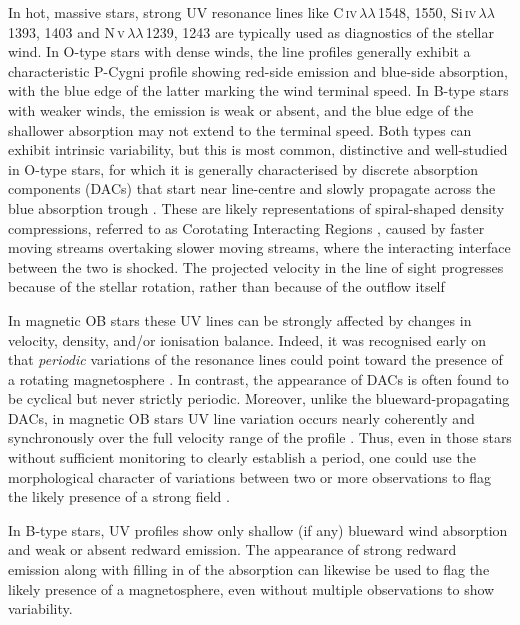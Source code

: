 \documentclass[useAMS,usenatbib]{mn2e}
\begin{document}
In hot, massive stars, strong UV resonance lines like C\,\textsc{iv}\,$\lambda\lambda$\,1548, 1550, Si\,\textsc{iv}\,$\lambda\lambda$\,1393, 1403 and N\,\textsc{v}\,$\lambda\lambda$\,1239, 1243 are typically used as diagnostics of the stellar wind. In O-type stars with dense winds, the line profiles generally exhibit a characteristic P-Cygni profile showing red-side emission and blue-side absorption, with the blue edge of the latter marking the wind terminal speed.
In B-type stars with weaker winds, the emission is weak or absent, and the blue edge of the shallower absorption may not extend to the terminal speed.
Both types can exhibit intrinsic variability, but this is most common, distinctive and well-studied in O-type stars, 
for which it is generally
characterised by discrete absorption components (DACs) that start near line-centre and 
slowly propagate across the blue absorption trough \citep[e.g.][]{1989ApJS...69..527H,1996A&AS..116..257K}. 
These are likely representations of spiral-shaped density compressions, referred to as Corotating Interacting Regions
\citep[CIRs,][]{1986A&A...165..157M}, caused by faster moving streams overtaking slower moving streams, where the interacting interface between the two is shocked. The projected velocity in the line of sight progresses because of the stellar rotation, rather than because of the outflow itself \citep{1996ApJ...462..469C}

In magnetic OB stars these UV lines can be strongly affected by changes in velocity, density, and/or ionisation balance.
Indeed, it was recognised early on that \textit{periodic} variations of the resonance lines could point toward the presence of a rotating magnetosphere \cite[e.g.][]{1990ApJ...365..665S,1993npsp.conf..186H,1994ApJ...425L..29W}.
In contrast, the appearance of DACs is often found to be cyclical but never strictly periodic.
Moreover, unlike the blueward-propagating DACs, in magnetic OB stars  UV line variation occurs nearly coherently and  synchronously over the full velocity range of the profile \citep[e.g.][]{2012MNRAS.422.2314M,henrichs_siglupi}.
Thus, even in those stars without sufficient monitoring to clearly establish a period, one could use the morphological character of variations between two or more observations to flag the likely presence of a strong field \citep[e.g.][]{henrichs_siglupi}.

In B-type stars, UV profiles show only shallow (if any) blueward wind absorption and weak or absent redward emission. The appearance of strong redward emission along with filling in of the absorption \cite[see Figure 5 of][]{1990ApJ...365..665S} can likewise be used to flag the likely presence of a magnetosphere, even without multiple observations to show variability.
\end{document}

